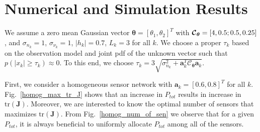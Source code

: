 \documentclass[conference]{IEEEtran}
\begin{document}
\section{Numerical and Simulation Results} \label{simulation}
We assume a zero mean Gaussian vector
$\boldsymbol{\theta}=\left[\theta_1,\theta_2\right]^T$ with $\boldsymbol{\cal C}_{\boldsymbol{\theta}}=[4,0.5;0.5,0.25]$, and $\sigma_{n_k}\!=\!1$, $\sigma_{\nu_k}\!=\!1$, $|h_k|\!=\!0.7$, $L_k=3$ for all $k$. We choose a proper $\tau_k$ based on the observation model and joint pdf of the unknown vector such that $p(|x_k|\geq\tau_k)\approx0$. To this end, we choose $\tau_k=3\sqrt{\sigma_{n_k}^2+\mathbf{a}_k^T\boldsymbol{\mathcal C}_{\boldsymbol{\theta}}\mathbf{a}_k}$. 

First, we consider a homogeneous sensor network with $\mathbf{a}_k=[0.6,0.8]^T$ for all $k$. Fig.~\ref{homog_max_tr_J} shows that an increase in $P_{tot}$ results in increase in $\text{tr}(\boldsymbol{J})$. Moreover, we are interested to know the optimal number of sensors that maximizes $\text{tr}(\boldsymbol{J})$. From Fig.~\ref{homog_num_of_sen} we observe that for a given $P_{tot}$, it is always beneficial to uniformly allocate $P_{tot}$ among all of the sensors. 
\end{document}
